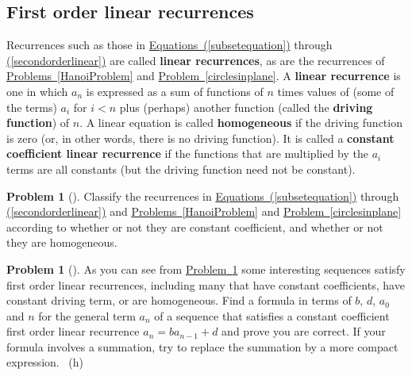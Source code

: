 \documentclass[10pt,]{book}
\newcommand{\terminology}[1]{\textbf{#1}}
\theoremstyle{plain}
\theoremstyle{definition}
\newtheorem{activity}[project]{Problem}
\theoremstyle{definition}
\numberwithin{equation}{chapter}
\newcommand{\lt}{<}
\begin{document}
\subsection[{First order linear recurrences}]{First order linear recurrences}\label{subsection-19}
\hypertarget{p-572}{}%
Recurrences such as those in \hyperref[subsetequation]{Equations~(\ref{subsetequation})} through \hyperref[secondorderlinear]{(\ref{secondorderlinear})} are called \terminology{linear recurrences}, as are the recurrences of \hyperref[HanoiProblem]{Problems~\ref{HanoiProblem}} and \hyperref[circlesinplane]{Problem~\ref{circlesinplane}}. A \terminology{linear recurrence} is one in which \(a_n\) is expressed as a sum of functions of \(n\) times values of (some of the terms) \(a_i\) for \(i\lt n\) plus (perhaps) another function (called the \terminology{driving function}) of \(n\). A linear equation is called \terminology{homogeneous} if the driving function is zero (or, in other words, there is no driving function). It is called a \terminology{constant coefficient linear recurrence} if the functions that are multiplied by the \(a_i\) terms are all constants (but the driving function need not be constant).%
\begin{activity}[]\marginsymbol[-1em]{} \label{classifyrecurrences}
\hypertarget{p-573}{}%
Classify the recurrences in \hyperref[subsetequation]{Equations~(\ref{subsetequation})} through \hyperref[secondorderlinear]{(\ref{secondorderlinear})} and \hyperref[HanoiProblem]{Problems~\ref{HanoiProblem}} and \hyperref[circlesinplane]{Problem~\ref{circlesinplane}} according to whether or not they are constant coefficient, and whether or not they are homogeneous.%
\end{activity}
\begin{activity}[] \label{firstordlinconst}
\hypertarget{p-575}{}%
As you can see from \hyperref[classifyrecurrences]{Problem~\ref{classifyrecurrences}} some interesting sequences satisfy first order linear recurrences, including many that have constant coefficients, have constant driving term, or are homogeneous. Find a formula in terms of \(b\), \(d\), \(a_0\) and \(n\) for the general term \(a_n\) of a sequence that satisfies a constant coefficient first order linear recurrence \(a_n = ba_{n-1} + d\) and prove you are correct. If your formula involves a summation, try to replace the summation by a more compact expression.%
~{\tiny (h)}\end{activity}
\typeout{************************************************}
\typeout{************************************************}
\end{document}
